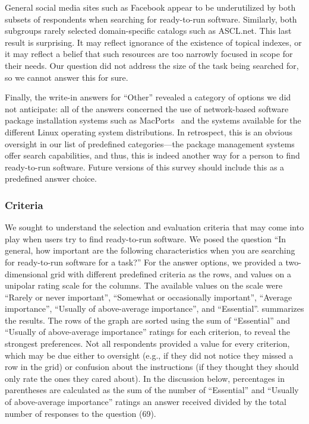 \documentclass{casicswhitepaper}
\newcommand{\totalRespondents}{69\xspace}
\begin{document}
General social media sites such as Facebook appear to be underutilized by both subsets of respondents when searching for ready-to-run software.  Similarly, both subgroups rarely selected domain-specific catalogs such as ASCL.net.  This last result is surprising.  It may reflect ignorance of the existence of topical indexes, or it may reflect a belief that such resources are too narrowly focused in scope for their needs.  Our question did not address the size of the task being searched for, so we cannot answer this for sure.

Finally, the write-in answers for ``Other'' revealed a category of options we did not anticipate: all of the answers concerned the use of network-based software package installation systems such as MacPorts~\cite{fuller2002macports} and the systems available for the different Linux operating system distributions.  In retrospect, this is an obvious oversight in our list of predefined categories---the package management systems offer search capabilities, and thus, this is indeed another way for a person to find ready-to-run software.  Future versions of this survey should include this as a predefined answer choice.


\subsubsection{Criteria}
\label{criteria-ready-to-use}

We sought to understand the selection and evaluation criteria that may come into play when users try to find ready-to-run software.  We posed the question ``In general, how important are the following characteristics when you are searching for ready-to-run software for a task?''  For the answer options, we provided a two-dimensional grid with different predefined criteria as the rows, and values on a unipolar rating scale for the columns.  The available values on the scale were ``Rarely or never important'', ``Somewhat or occasionally important'', ``Average importance'', ``Usually of above-average importance'', and ``Essential''.  summarizes the results.  The rows of the graph are sorted using the sum of ``Essential'' and ``Usually of above-average importance'' ratings for each criterion, to reveal the strongest preferences.  Not all respondents provided a value for every criterion, which may be due either to oversight (e.g., if they did not notice they missed a row in the grid) or confusion about the instructions (if they thought they should only rate the ones they cared about).  In the discussion below, percentages in parentheses are calculated as the sum of the number of ``Essential'' and ``Usually of above-average importance'' ratings an answer received divided by the total number of responses to the question (\totalRespondents).
\end{document}
